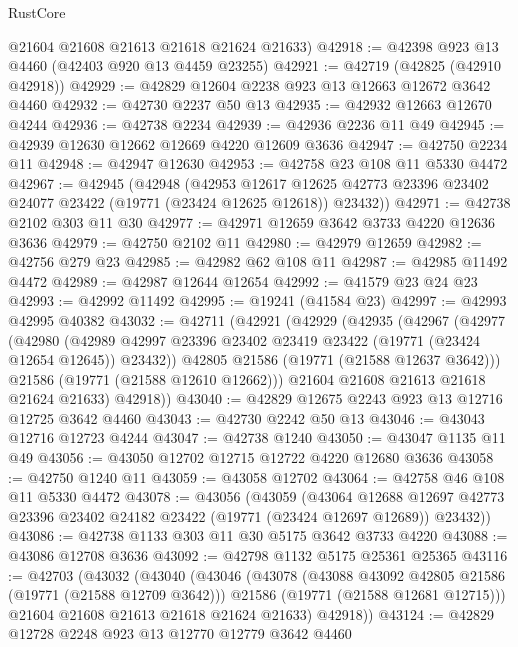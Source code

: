 \begin{lexlean}{RustCore}
\begin{coremodule}
      @21604
      @21608
      @21613
      @21618
      @21624
      @21633)
@42918 := @42398 @923 @13 @4460 (@42403 @920 @13 @4459 @23255)
@42921 := @42719 (@42825 (@42910 @42918))
@42929 := @42829 @12604 @2238 @923 @13 @12663 @12672 @3642 @4460
@42932 := @42730 @2237 @50 @13
@42935 := @42932 @12663 @12670 @4244
@42936 := @42738 @2234
@42939 := @42936 @2236 @11 @49
@42945 := @42939 @12630 @12662 @12669 @4220 @12609 @3636
@42947 := @42750 @2234 @11
@42948 := @42947 @12630
@42953 := @42758 @23 @108 @11 @5330 @4472
@42967 := @42945
    (@42948
      (@42953
        @12617
        @12625
        @42773
        @23396
        @23402
        @24077
        @23422
        (@19771 (@23424 @12625 @12618))
        @23432))
@42971 := @42738 @2102 @303 @11 @30
@42977 := @42971 @12659 @3642 @3733 @4220 @12636 @3636
@42979 := @42750 @2102 @11
@42980 := @42979 @12659
@42982 := @42756 @279 @23
@42985 := @42982 @62 @108 @11
@42987 := @42985 @11492 @4472
@42989 := @42987 @12644 @12654
@42992 := @41579 @23 @24 @23
@42993 := @42992 @11492
@42995 := @19241 (@41584 @23)
@42997 := @42993 @42995 @40382
@43032 := @42711
    (@42921
      (@42929
        (@42935
          (@42967
            (@42977
              (@42980
                (@42989 @42997 @23396 @23402 @23419 @23422 (@19771 (@23424 @12654 @12645)) @23432))
              @42805
              @21586
              (@19771 (@21588 @12637 @3642)))
            @21586
            (@19771 (@21588 @12610 @12662)))
          @21604
          @21608
          @21613
          @21618
          @21624
          @21633)
        @42918))
@43040 := @42829 @12675 @2243 @923 @13 @12716 @12725 @3642 @4460
@43043 := @42730 @2242 @50 @13
@43046 := @43043 @12716 @12723 @4244
@43047 := @42738 @1240
@43050 := @43047 @1135 @11 @49
@43056 := @43050 @12702 @12715 @12722 @4220 @12680 @3636
@43058 := @42750 @1240 @11
@43059 := @43058 @12702
@43064 := @42758 @46 @108 @11 @5330 @4472
@43078 := @43056
    (@43059
      (@43064
        @12688
        @12697
        @42773
        @23396
        @23402
        @24182
        @23422
        (@19771 (@23424 @12697 @12689))
        @23432))
@43086 := @42738 @1133 @303 @11 @30 @5175 @3642 @3733 @4220
@43088 := @43086 @12708 @3636
@43092 := @42798 @1132 @5175 @25361 @25365
@43116 := @42703
    (@43032
      (@43040
        (@43046
          (@43078
            (@43088 @43092 @42805 @21586 (@19771 (@21588 @12709 @3642)))
            @21586
            (@19771 (@21588 @12681 @12715)))
          @21604
          @21608
          @21613
          @21618
          @21624
          @21633)
        @42918))
@43124 := @42829 @12728 @2248 @923 @13 @12770 @12779 @3642 @4460

\end{coremodule}
\end{lexlean}

